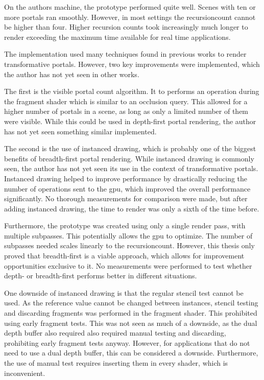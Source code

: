 On the authors machine, the prototype performed quite well. Scenes with ten or more portals ran smoothly. However, in most settings the \gls{recursioncount} cannot be higher than four. Higher recursion counts took increasingly much longer to render exceeding the maximum time available for real time applications.



The implementation used many techniques found in previous works to render transformative portals. However, two key improvements were implemented, which the author has not yet seen in other works.

The first is the visible portal count algorithm. It to performs an operation during the fragment shader which is similar to an occlusion query. This allowed for a higher number of portals in a scene, as long as only a limited number of them were visible. While this could be used in depth-first portal rendering, the author has not yet seen something similar implemented.

The second is the use of instanced drawing, which is probably one of the biggest benefits of breadth-first portal rendering. While instanced drawing is commonly seen, the author has not yet seen its use in the context of transformative portals. Instanced drawing helped to improve performance by drastically reducing the number of operations sent to the \gls{gpu}, which improved the overall performance significantly. No thorough measurements for comparison were made, but after adding instanced drawing, the time to render was only a sixth of the time before. 

Furthermore, the prototype was created using only a single render pass, with multiple subpasses. This potentially allows the \gls{gpu} to optimize. The number of subpasses needed scales linearly to the \gls{recursioncount}. However, this thesis only proved that breadth-first is a viable approach, which allows for improvement opportunities exclusive to it. No measurements were performed to test whether depth- or breadth-first performs better in different situations.

One downside of instanced drawing is that the regular stencil test cannot be used. As the reference value cannot be changed between instances, stencil testing and discarding fragments was performed in the fragment shader. This prohibited using early fragment tests. This was not seen as much of a downside, as the dual depth buffer also required also required manual testing and discarding, prohibiting early fragment tests anyway. However, for applications that do not need to use a dual depth buffer, this can be considered a downside. Furthermore, the use of manual test requires inserting them in every shader, which is inconvenient.

